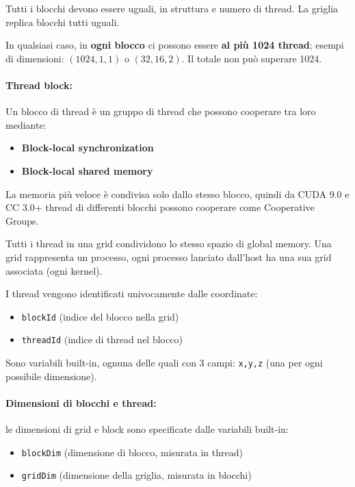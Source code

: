 Tutti i blocchi devono essere uguali, in struttura e numero di thread. La griglia replica blocchi tutti uguali.

In qualsiasi caso, in \textbf{ogni blocco} ci possono essere \textbf{al più 1024 thread}; esempi di dimensioni: $(1024, 1, 1)$  o $(32, 16, 2)$. Il totale non può superare 1024.

\paragraph{Thread block:} Un blocco di thread è un gruppo di thread che possono cooperare tra loro mediante:
\begin{itemize}
	\item \textbf{Block-local synchronization}
	
	\item \textbf{Block-local shared memory}
\end{itemize}

La memoria più veloce è condivisa solo dallo stesso blocco, quindi da CUDA 9.0 e CC 3.0+ thread di differenti blocchi possono cooperare come Cooperative Groups.

Tutti i thread in una grid condividono lo stesso spazio di global memory. Una grid rappresenta un processo, ogni processo lanciato dall'host ha una sua grid associata (ogni kernel).

I thread vengono identificati univocamente dalle coordinate: 
\begin{itemize}
	\item \texttt{blockId} (indice del blocco nella grid)
	
	\item \texttt{threadId} (indice di thread nel blocco)
\end{itemize}

Sono variabili built-in, ognuna delle quali con 3 campi: \texttt{x,y,z} (una per ogni possibile dimensione).

\paragraph{Dimensioni di blocchi e thread:} le dimensioni di grid e block sono specificate dalle variabili built-in: 
\begin{itemize}
	\item \texttt{blockDim} (dimensione di blocco, misurata in thread)
	
	\item \texttt{gridDim} (dimensione della griglia, misurata in blocchi)
\end{itemize}

